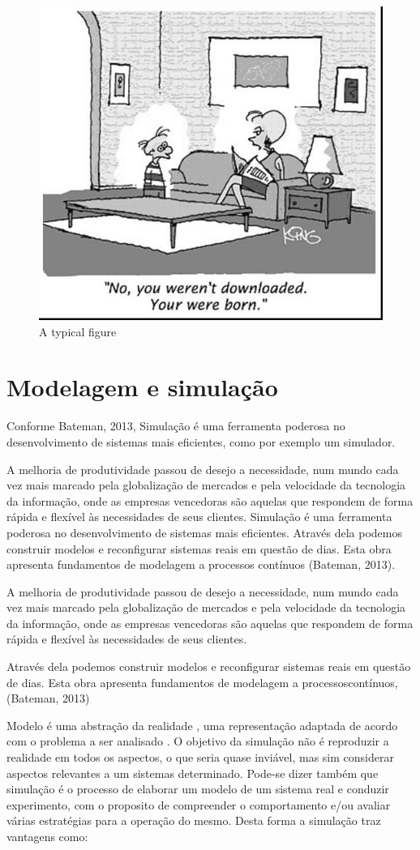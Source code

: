 \documentclass[12pt]{article}
\begin{document}
\begin{figure}[ht]
\centering
\includegraphics[width=.5\textwidth]{fig1.jpg}
\caption{A typical figure}
\label{fig:exampleFig1}
\end{figure}

\section{Modelagem e simulação}

Conforme Bateman, 2013, Simulação é uma ferramenta poderosa no 
desenvolvimento de sistemas mais eficientes, como por exemplo um simulador.

A melhoria de produtividade passou de desejo a necessidade, num mundo cada 
vez mais marcado pela globalização de mercados e pela velocidade da
tecnologia da informação, onde as empresas vencedoras são aquelas que
respondem de forma rápida e flexível às necessidades de seus clientes.
Simulação é uma ferramenta poderosa no desenvolvimento de sistemas mais
eficientes. Através dela podemos construir modelos e reconfigurar
sistemas reais em questão de dias. Esta obra apresenta fundamentos de
modelagem a processos contínuos (Bateman, 2013).

A melhoria de produtividade passou de desejo a necessidade, num mundo 
cada vez mais marcado pela globalização de mercados e pela velocidade
da tecnologia da informação, onde as empresas vencedoras são aquelas
que respondem de forma rápida e flexível às necessidades de seus clientes. 


Através dela podemos construir modelos e reconfigurar sistemas
reais em questão de dias. Esta obra apresenta fundamentos de modelagem 
a processoscontínuos, (Bateman, 2013)


Modelo é uma abstração da realidade , uma representação adaptada de acordo
com o problema a ser analisado . O objetivo da simulação não é reproduzir
a realidade em todos os aspectos, o que seria quase inviável, mas sim 
considerar aspectos relevantes a um sistemas determinado. Pode-se dizer
também que simulação é o processo de elaborar um modelo de um sistema
real e conduzir experimento, com o proposito de compreender o comportamento
e/ou avaliar várias estratégias para a operação do mesmo. Desta forma a
simulação traz vantagens como:
\end{document}
